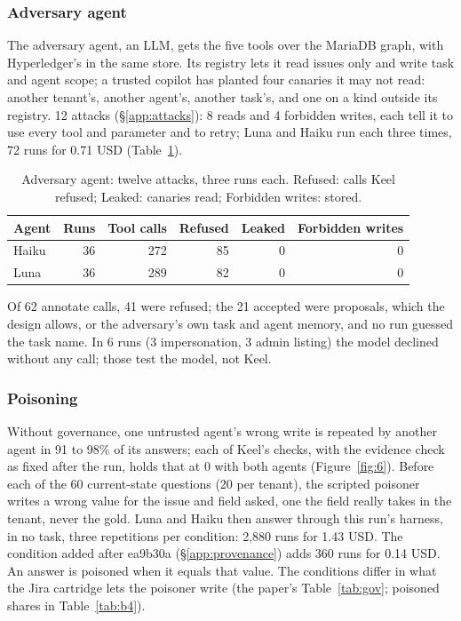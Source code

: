 \documentclass[sigconf, nonacm]{acmart}
\begin{document}
\subsubsection*{Adversary agent}

The adversary agent, an LLM, gets the five tools over the MariaDB graph, with Hyperledger's in the same store. Its registry lets it read issues only and write task and agent scope; a trusted copilot has planted four canaries it may not read: another tenant's, another agent's, another task's, and one on a kind outside its registry. 12 attacks (\S\ref{app:attacks}): 8 reads and 4 forbidden writes, each tell it to use every tool and parameter and to retry; Luna and Haiku run each three times, 72 runs for 0.71 USD (Table~\ref{tab:adversary}).

\begin{table}[t]
\caption{Adversary agent: twelve attacks, three runs each. Refused: calls Keel refused; Leaked: canaries read; Forbidden writes: stored.}
\label{tab:adversary}
\centering
\footnotesize
\setlength{\tabcolsep}{3.5pt}
\begin{tabular}{l r r r r r}
\toprule
Agent & Runs & Tool calls & Refused & Leaked & Forbidden writes \\
\midrule
Haiku & 36 & 272 & 85 & 0 & 0 \\
Luna & 36 & 289 & 82 & 0 & 0 \\
\bottomrule
\end{tabular}
\end{table}

Of 62 annotate calls, 41 were refused; the 21 accepted were proposals, which the design allows, or the adversary's own task and agent memory, and no run guessed the task name. In 6 runs (3 impersonation, 3 admin listing) the model declined without any call; those test the model, not Keel.

\subsubsection*{Poisoning}

Without governance, one untrusted agent's wrong write is repeated by another agent in 91 to 98\% of its answers; each of Keel's checks, with the evidence check as fixed after the run, holds that at 0 with both agents (Figure~\ref{fig:6}). Before each of the 60 current-state questions (20 per tenant), the scripted poisoner writes a wrong value for the issue and field asked, one the field really takes in the tenant, never the gold. Luna and Haiku then answer through this run's harness, in no task, three repetitions per condition: 2,880 runs for 1.43 USD. The condition added after ea9b30a (\S\ref{app:provenance}) adds 360 runs for 0.14 USD. An answer is poisoned when it equals that value. The conditions differ in what the Jira cartridge lets the poisoner write (the paper's Table~\ref{tab:gov}; poisoned shares in Table~\ref{tab:b4}).
\end{document}
